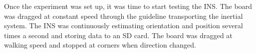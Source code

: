 Once the experiment was set up, it was time to start testing the INS. The board was dragged at constant speed through the guideline transporting the inertial system. The INS was continuously estimating orientation and position several times a second and storing data to an SD card. The board was dragged at walking speed and stopped at corners when direction changed.

\begin{figure}
    \centering


\end{figure}
